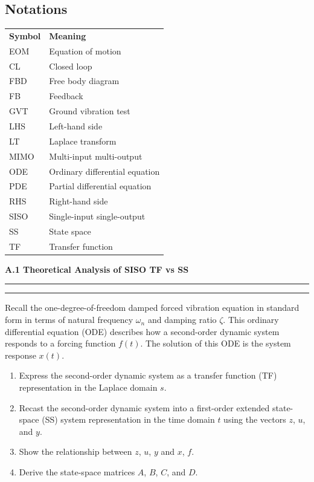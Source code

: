 \documentclass[12pt]{article}
\newcommand{\question}[1]{%
  \clearpage
  \vspace{0.5cm}
  {\noindent\normalsize \textbf{#1}}%
  \vspace{0.2cm}
  \hrule
  \vspace{0.1cm}
  \hrule
  \vspace{0.3cm}
}
\begin{document}
\subsection*{Notations}
\begin{tcolorbox}[colback=white,colframe=black,colbacktitle=gray!20!white,
                  coltitle=black,sharp corners,boxrule=1pt,
                  title=Notation Reference]
\begin{tabular}{@{}ll@{}}
\textbf{Symbol} & \textbf{Meaning} \\
EOM & Equation of motion \\
CL & Closed loop \\
FBD & Free body diagram \\
FB & Feedback \\
GVT & Ground vibration test \\
LHS & Left-hand side \\
LT & Laplace transform \\
MIMO & Multi-input multi-output \\
ODE & Ordinary differential equation \\
PDE & Partial differential equation \\
RHS & Right-hand side \\
SISO & Single-input single-output \\
SS & State space \\
TF & Transfer function \\
\end{tabular}
\end{tcolorbox}


\question{A.1 Theoretical Analysis of SISO TF vs SS}\label{quest:A1}

Recall the one-degree-of-freedom damped forced vibration equation in standard form in terms of natural frequency $\omega_n$ and damping ratio $\zeta$. This ordinary differential equation (ODE) describes how a second-order dynamic system responds to a forcing function $f(t)$. The solution of this ODE is the system response $x(t)$.
\begin{enumerate}[label=(\alph*)]
  \item Express the second-order dynamic system as a transfer function (TF) representation in the Laplace domain $s$.
  \item Recast the second-order dynamic system into a first-order extended state-space (SS) system representation in the time domain $t$ using the vectors $z$, $u$, and $y$.
  \item Show the relationship between $z$, $u$, $y$ and $x$, $f$.
  \item Derive the state-space matrices $A$, $B$, $C$, and $D$.
\end{enumerate}
\end{document}
